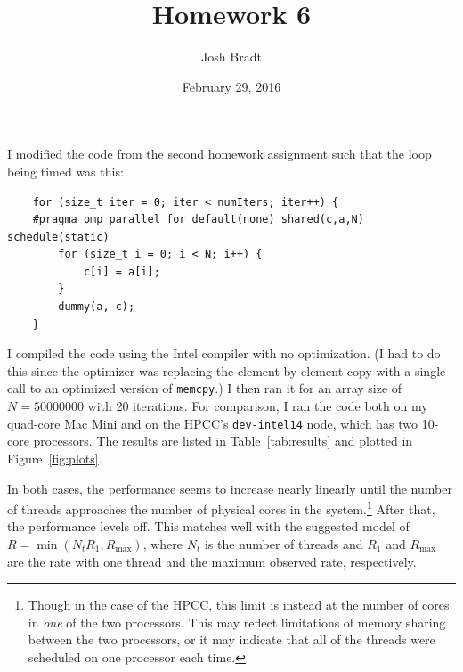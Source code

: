 \documentclass{article}
\title{Homework 6}
\author{Josh Bradt}
\date{February 29, 2016}
\begin{document}
\maketitle

I modified the code from the second homework assignment such that the loop being timed was this:
\begin{verbatim}
    for (size_t iter = 0; iter < numIters; iter++) {
    #pragma omp parallel for default(none) shared(c,a,N) schedule(static)
        for (size_t i = 0; i < N; i++) {
            c[i] = a[i];
        }
        dummy(a, c);
    }
\end{verbatim}
I compiled the code using the Intel compiler with no optimization. (I had to do this since the optimizer was replacing the element-by-element copy with a single call to an optimized version of \texttt{memcpy}.) I then ran it for an array size of $N=\num{50000000}$ with 20 iterations. For comparison, I ran the code both on my quad-core Mac Mini and on the HPCC's \texttt{dev-intel14} node, which has two 10-core processors. The results are listed in Table~\ref{tab:results} and plotted in Figure~\ref{fig:plots}.

In both cases, the performance seems to increase nearly linearly until the number of threads approaches the number of physical cores in the system.\footnote{Though in the case of the HPCC, this limit is instead at the number of cores in \emph{one} of the two processors. This may reflect limitations of memory sharing between the two processors, or it may indicate that all of the threads were scheduled on one processor each time.} After that, the performance levels off. This matches well with the suggested model of $R = \min(N_t R_1, R_\text{max})$, where $N_t$ is the number of threads and $R_1$ and $R_\text{max}$ are the rate with one thread and the maximum observed rate, respectively.
\end{document}
